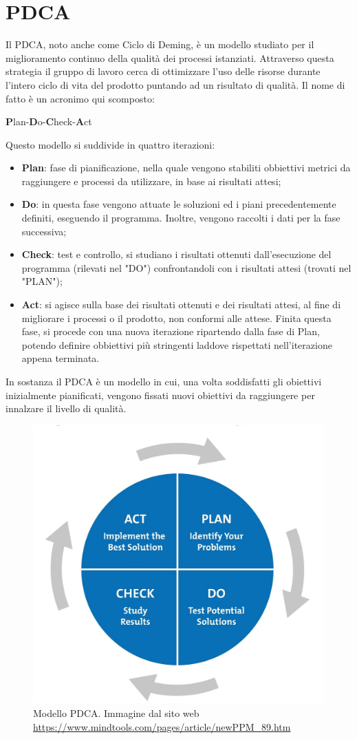 \section{PDCA}\label{PDCASection}
Il PDCA, noto anche come Ciclo di Deming, è un modello studiato per il miglioramento continuo della qualità dei processi istanziati. Attraverso questa strategia il gruppo di lavoro cerca di ottimizzare l'uso delle risorse durante l'intero ciclo di vita del prodotto puntando ad un risultato di qualità. Il nome di fatto è un acronimo qui scomposto:
\begin{center}
	\item \textbf{P}lan-\textbf{D}o-\textbf{C}heck-\textbf{A}ct
\end{center}
Questo modello si suddivide in quattro iterazioni:
\begin{itemize}
	\item \textbf{Plan}: fase di pianificazione, nella quale vengono stabiliti obbiettivi metrici da raggiungere e processi da utilizzare, in base ai risultati attesi;
	\item \textbf{Do}: in questa fase vengono attuate le soluzioni ed i piani precedentemente definiti, eseguendo il programma. Inoltre, vengono raccolti i dati per la fase successiva;
	\item \textbf{Check}: test e controllo, si studiano i risultati ottenuti dall'esecuzione del programma (rilevati nel "DO") confrontandoli con i risultati attesi (trovati nel "PLAN"); 
	\item \textbf{Act}: si agisce sulla base dei risultati ottenuti e dei risultati attesi, al fine di migliorare i processi o il prodotto, non conformi alle attese. Finita questa fase, si procede con una nuova iterazione ripartendo dalla fase di Plan, potendo definire obbiettivi più stringenti laddove rispettati nell'iterazione appena terminata.
\end{itemize}
In sostanza il PDCA è un modello in cui, una volta soddisfatti gli obiettivi inizialmente pianificati, vengono fissati nuovi obiettivi da raggiungere per innalzare il livello di qualità.

\begin{figure}[H]
\centering
	\includegraphics[width=0.4\linewidth]{./images/pdca.jpg}
	\caption{Modello PDCA. Immagine dal sito web \url{https://www.mindtools.com/pages/article/newPPM_89.htm}}
	\label{pdca}
\end{figure} 

 